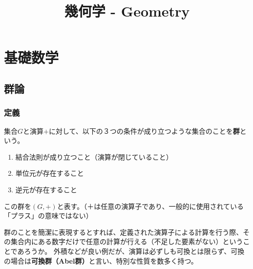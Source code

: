 \documentclass[a4paper]{jsreport}
\title{幾何学 - Geometry}
\begin{document}
    \maketitle

    \tableofcontents

    \chapter{基礎数学}
        \section{群論}
            \subsection*{定義}
                集合$G$と演算$+$に対して、以下の３つの条件が成り立つような集合のことを\textbf{群}という。
                \begin{enumerate}
                    \item 結合法則が成り立つこと（演算が閉じていること）
                    \item 単位元が存在すること
                    \item 逆元が存在すること
                \end{enumerate}
                この群を$(G, +)$と表す。（＋は任意の演算子であり、一般的に使用されている「プラス」の意味ではない）\par
                群のことを簡潔に表現するとすれば、定義された演算子による計算を行う際、その集合内にある数字だけで任意の計算が行える（不足した要素がない）ということであろうか。
                外積などが良い例だが、演算は必ずしも可換とは限らず、可換の場合は\textbf{可換群（Abel群）}と言い、特別な性質を数多く持つ。
\end{document}
